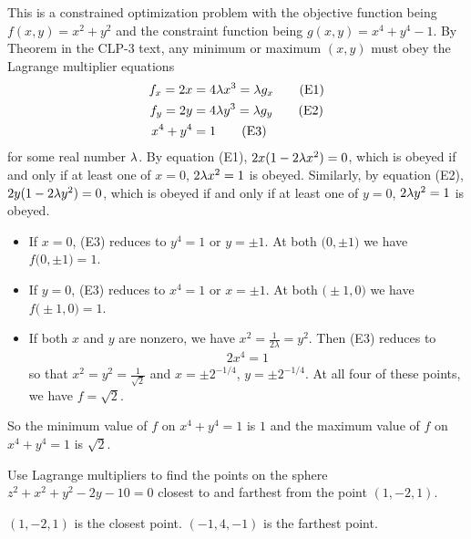 \begin{solution}
This is a constrained optimization problem with the objective function being
$f(x,y) = x^2 + y^2$ and the constraint function being
$g(x,y) =x^4 + y^4 - 1$.
By Theorem  in the CLP-3 text, any minimum
or maximum $(x,y)$ must obey the  Lagrange multiplier equations
\begin{align*}
f_x = 2x &=4 \lambda x^3 = \lambda g_x \tag{E1} \\ 
f_y = 2y &=4 \lambda y^3 = \lambda g_y \tag{E2} \\ 
x^4 + y^4 &= 1 \tag{E3}
\end{align*}
for some real number $\lambda$. By equation (E1), $2x(1-2\lambda x^2)=0$, which is
obeyed if and only if at least one of $x=0$, $2\lambda x^2=1$ is obeyed.
Similarly, by equation (E2), $2y(1-2\lambda y^2)=0$, which is
obeyed if and only if at least one of $y=0$, $2\lambda y^2=1$ is obeyed.
\begin{itemize}
\item 
If $x=0$, (E3) reduces to $y^4=1$ or $y=\pm 1$. At both
$\big(0,\pm 1\big)$ we have $f\big(0,\pm1\big)=1$.
\item 
If $y=0$, (E3) reduces to $x^4=1$ or $x=\pm 1$. At both
$\big(\pm 1,0\big)$ we have $f\big(\pm1,0\big)=1$.
\item
If both $x$ and $y$ are nonzero, we have $x^2=\frac{1}{2\lambda}=y^2$.
Then (E3) reduces to
\begin{align*}
2x^4=1 
\end{align*}
so that
$x^2=y^2=\frac{1}{\sqrt{2}}$ and $x=\pm 2^{-1/4}$,
$y=\pm 2^{-1/4}$.  At all four of these points, we
have $f=\sqrt{2}$.

\end{itemize}
So the minimum value of $f$ on $x^4+y^4=1$ is $1$ and
the maximum value of $f$ on $x^4+y^4=1$ is $\sqrt{2}$.  
\end{solution}

\begin{question}[M200 2008D] %
Use Lagrange multipliers to find the points on the sphere
$z^2 + x^2 + y^2 - 2y - 10 = 0$ closest to and farthest from the point 
$(1, -2, 1)$.
\end{question}

%

\begin{answer}
$(1,-2,1)$  is the closest point. 
$(-1,4,-1)$ is the farthest point.
\end{answer}

